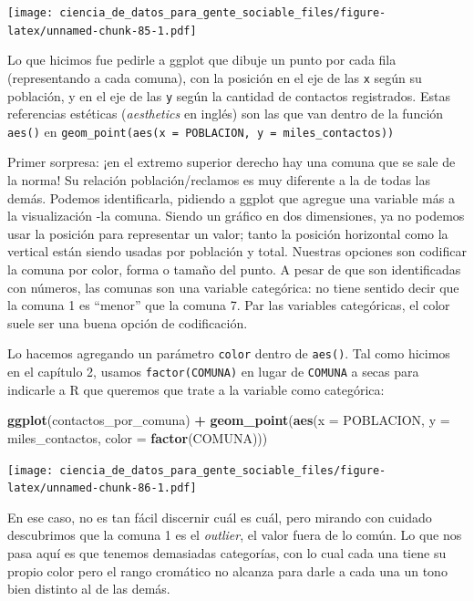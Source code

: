 \documentclass[spanish,]{book}
\newenvironment{Shaded}{\begin{snugshade}}{\end{snugshade}}
\newcommand{\DataTypeTok}[1]{\textcolor[rgb]{0.13,0.29,0.53}{#1}}
\newcommand{\KeywordTok}[1]{\textcolor[rgb]{0.13,0.29,0.53}{\textbf{#1}}}
\newcommand{\NormalTok}[1]{#1}
\newcommand{\OperatorTok}[1]{\textcolor[rgb]{0.81,0.36,0.00}{\textbf{#1}}}
\newcommand{\StringTok}[1]{\textcolor[rgb]{0.31,0.60,0.02}{#1}}
\begin{document}
\texttt{[image: ciencia\_de\_datos\_para\_gente\_sociable\_files/figure-latex/unnamed-chunk-85-1.pdf]}

Lo que hicimos fue pedirle a ggplot que dibuje un punto por cada fila (representando a cada comuna), con la posición en el eje de las \texttt{x} según su población, y en el eje de las \texttt{y} según la cantidad de contactos registrados. Estas referencias estéticas (\emph{aesthetics} en inglés) son las que van dentro de la función \texttt{aes()} en \texttt{geom\_point(aes(x\ =\ POBLACION,\ y\ =\ miles\_contactos))}

Primer sorpresa: ¡en el extremo superior derecho hay una comuna que se sale de la norma! Su relación población/reclamos es muy diferente a la de todas las demás. Podemos identificarla, pidiendo a ggplot que agregue una variable más a la visualización -la comuna. Siendo un gráfico en dos dimensiones, ya no podemos usar la posición para representar un valor; tanto la posición horizontal como la vertical están siendo usadas por población y total. Nuestras opciones son codificar la comuna por color, forma o tamaño del punto. A pesar de que son identificadas con números, las comunas son una variable categórica: no tiene sentido decir que la comuna 1 es ``menor'' que la comuna 7. Par las variables categóricas, el color suele ser una buena opción de codificación.

Lo hacemos agregando un parámetro \texttt{color} dentro de \texttt{aes()}. Tal como hicimos en el capítulo 2, usamos \texttt{factor(COMUNA)} en lugar de \texttt{COMUNA} a secas para indicarle a R que queremos que trate a la variable como categórica:

\begin{Shaded}
\begin{Highlighting}[]
\KeywordTok{ggplot}\NormalTok{(contactos_por_comuna) }\OperatorTok{+}\StringTok{ }
\StringTok{    }\KeywordTok{geom_point}\NormalTok{(}\KeywordTok{aes}\NormalTok{(}\DataTypeTok{x =}\NormalTok{ POBLACION, }\DataTypeTok{y =}\NormalTok{ miles_contactos, }\DataTypeTok{color =} \KeywordTok{factor}\NormalTok{(COMUNA)))}
\end{Highlighting}
\end{Shaded}

\texttt{[image: ciencia\_de\_datos\_para\_gente\_sociable\_files/figure-latex/unnamed-chunk-86-1.pdf]}

En ese caso, no es tan fácil discernir cuál es cuál, pero mirando con cuidado descubrimos que la comuna 1 es el \emph{outlier}, el valor fuera de lo común. Lo que nos pasa aquí es que tenemos demasiadas categorías, con lo cual cada una tiene su propio color pero el rango cromático no alcanza para darle a cada una un tono bien distinto al de las demás.
\end{document}
